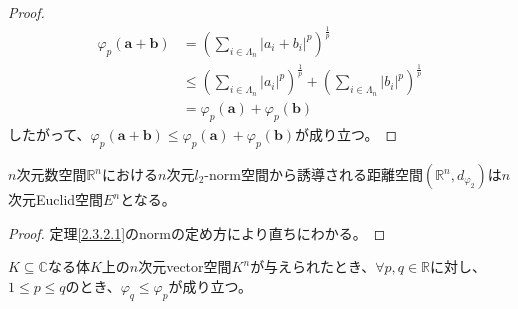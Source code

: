 \documentclass[dvipdfmx]{jsarticle}
\begin{document}
\begin{proof}
\begin{align*}
\varphi_{p}\left( \mathbf{a} + \mathbf{b} \right) &= \left( \sum_{i \in \varLambda_{n}} \left| a_{i} + b_{i} \right|^{p} \right)^{\frac{1}{p}}\\
&\leq \left( \sum_{i \in \varLambda_{n}} \left| a_{i} \right|^{p} \right)^{\frac{1}{p}} + \left( \sum_{i \in \varLambda_{n}} \left| b_{i} \right|^{p} \right)^{\frac{1}{p}}\\
&= \varphi_{p}\left( \mathbf{a} \right) + \varphi_{p}\left( \mathbf{b} \right)
\end{align*}
したがって、$\varphi_{p}\left( \mathbf{a} + \mathbf{b} \right) \leq \varphi_{p}\left( \mathbf{a} \right) + \varphi_{p}\left( \mathbf{b} \right)$が成り立つ。
\end{proof}
\begin{thm}\label{2.3.2.2}
$n$次元数空間$\mathbb{R}^{n}$における$n$次元$l_{2}$-norm空間から誘導される距離空間$\left( \mathbb{R}^{n},d_{\varphi_{2}} \right)$は$n$次元Euclid空間$E^{n}$となる。
\end{thm}
\begin{proof}
定理\ref{2.3.2.1}のnormの定め方により直ちにわかる。
\end{proof}
\begin{thm}\label{2.3.2.3}
$K \subseteq \mathbb{C}$なる体$K$上の$n$次元vector空間$K^{n}$が与えられたとき、$\forall p,q \in \mathbb{R}$に対し、$1 \leq p \leq q$のとき、$\varphi_{q} \leq \varphi_{p}$が成り立つ。
\end{thm}
\end{document}
